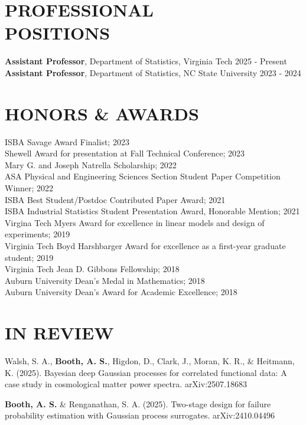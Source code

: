 \documentclass[margin,line,11pt]{res}
\begin{document}
\begin{resume}
\medskip
\section{\bf PROFESSIONAL \\ POSITIONS}

{\bf Assistant Professor}, Department of Statistics, {\sc Virginia Tech} \hfill 2025 - Present \\
{\bf Assistant Professor}, Department of Statistics, {\sc NC State University} \hfill 2023 - 2024

\bigskip
\section{\bf HONORS \& AWARDS}

ISBA Savage Award Finalist; 2023 \\
Shewell Award for presentation at Fall Technical Conference; 2023 \\
Mary G. and Joseph Natrella Scholarship; 2022 \\
ASA Physical and Engineering Sciences Section Student Paper Competition Winner; 2022 \\
ISBA Best Student/Postdoc Contributed Paper Award; 2021 \\
ISBA Industrial Statistics Student Presentation Award, Honorable Mention; 2021 \\
Virgina Tech Myers Award for excellence in linear models and design of experiments; 2019 \\
Virginia Tech Boyd Harshbarger Award for excellence as a first-year graduate student; 2019 \\
Virginia Tech Jean D. Gibbons Fellowship; 2018 \\
Auburn University Dean's Medal in Mathematics; 2018 \\
Auburn University Dean's Award for Academic Excellence; 2018

\medskip
\section{\bf{IN REVIEW}}

Walsh, S. A., {\bf Booth, A. S.}, Higdon, D., Clark, J., Moran, K. R., \& Heitmann, K. (2025). Bayesian deep Gaussian processes for correlated functional data: A case study in cosmological matter power spectra.  arXiv:2507.18683

{\bf Booth, A. S.} \& Renganathan, S. A. (2025). Two-stage design for failure probability estimation with Gaussian process surrogates. arXiv:2410.04496


\end{resume}
\end{document}
